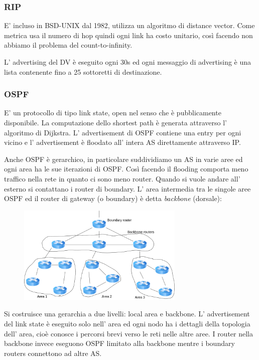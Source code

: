 \subsubsection{RIP}
E' incluso in BSD-UNIX dal 1982, utilizza un algoritmo di distance vector.
Come metrica usa il numero di hop quindi ogni link ha costo unitario, così facendo non abbiamo il problema del count-to-infinity.

L' advertising del DV è eseguito ogni 30s ed ogni messaggio di advertising è una lista contenente fino a 25 sottoretti di destinazione.

\subsubsection{OSPF}
E' un protocollo di tipo link state, open nel senso che è pubblicamente disponibile.
La computazione dello shortest path è generata attraverso l' algoritmo di Dijkstra.
L' advertisement di OSPF contiene una entry per ogni vicino e l' advertisement è floodato all' intera AS direttamente attraverso IP.

Anche OSPF è gerarchico, in particolare suddividiamo un AS in varie aree ed ogni area ha le sue iterazioni di OSPF.
Così facendo il flooding comporta meno traffico nella rete in quanto ci sono meno router.
Quando si vuole andare all' esterno si contattano i router di boundary.
L' area intermedia tra le singole aree OSPF ed il router di gateway (o boundary) è detta \emph{backbone} (dorsale):
\begin{figure}[H]
    \centering
    \includegraphics[width=300px]{images/5.1_Protocolli_di_routing/hierarchical_ospf.png}
\end{figure}
Si costruisce una gerarchia a due livelli: local area e backbone.
L' advertisement del link state è eseguito solo nell' area ed ogni nodo ha i dettagli della topologia dell' area, cioè conosce i percorsi brevi verso le reti nelle altre aree. 
I router nella backbone invece eseguono OSPF limitato alla backbone mentre i boundary routers connettono ad altre AS.


